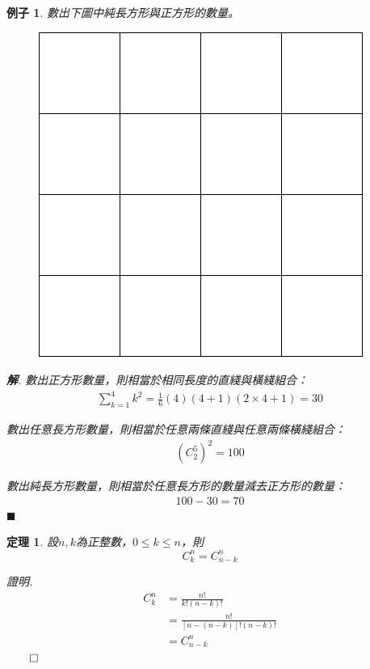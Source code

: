 \documentclass[12pt]{article}
\newtheorem*{theorem}{定理}
\newtheorem*{example}{例子}
\renewenvironment*{proof}{\textit{證明.}}{\hfill$\qed$}
\newenvironment*{sol}{\par \textbf{解}.}{\hfill$\blacksquare$}
\begin{document}
    \begin{example}
        數出下圖中純長方形與正方形的數量。
        \begin{figure}[H]
            \centering
            \includegraphics[scale=0.6]{nCr.png}
        \end{figure}

        \begin{sol}
            數出正方形數量，則相當於相同長度的直綫與橫綫組合：\begin{align*}
                \sum_{k=1}^{4}k^2=\frac{1}{6}(4)(4+1)(2\times 4+1)=30
            \end{align*}

            數出任意長方形數量，則相當於任意兩條直綫與任意兩條橫綫組合：\begin{align*}
                (C_2^5)^2=100
            \end{align*}

            數出純長方形數量，則相當於任意長方形的數量減去正方形的數量：\begin{align*}
                100-30=70
            \end{align*}
        \end{sol}
    \end{example}

    \begin{theorem}
        設$n,k$為正整數，$0\leq k\leq n$，則$$C_k^n=C_{n-k}^n$$
    \end{theorem}

    \begin{proof}
        \begin{align*}
            C_k^n&=\frac{n!}{k!(n-k)!}\\
            &=\frac{n!}{[n-(n-k)]!(n-k)!}\\
            &=C_{n-k}^n
        \end{align*}
    \end{proof}
\end{document}
